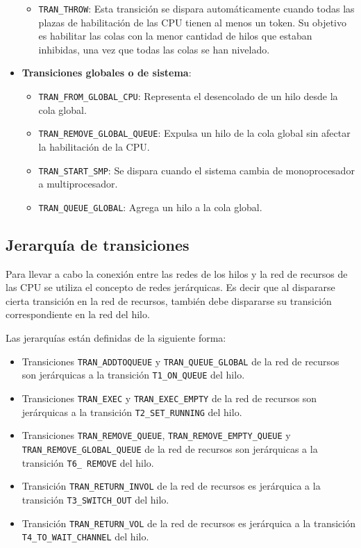\begin{itemize}
\begin{itemize}
            \item \verb|TRAN_THROW|: Esta transición se dispara automáticamente cuando todas las plazas de habilitación de las CPU tienen al menos un token. Su objetivo es habilitar las colas con la menor cantidad de hilos que estaban inhibidas, una vez que todas las colas se han nivelado.
        \end{itemize}
    \item \textbf{Transiciones globales o de sistema}:
        \begin{itemize}
            \item \verb|TRAN_FROM_GLOBAL_CPU|: Representa el desencolado de un hilo desde la cola global.
            \item \verb|TRAN_REMOVE_GLOBAL_QUEUE|: Expulsa un hilo de la cola global sin afectar la habilitación de la CPU.
            \item \verb|TRAN_START_SMP|: Se dispara cuando el sistema cambia de monoprocesador a multiprocesador.
            \item \verb|TRAN_QUEUE_GLOBAL|: Agrega un hilo a la cola global.
        \end{itemize}
    \end{itemize}


\subsection{Jerarquía de transiciones}
Para llevar a cabo la conexión entre las redes de los hilos y la red de recursos de las CPU se utiliza el concepto de redes jerárquicas. Es decir que al dispararse cierta transición en la red de recursos, también debe dispararse su transición correspondiente en la red del hilo.

Las jerarquías están definidas de la siguiente forma:

\begin{itemize}
    \item Transiciones \verb|TRAN_ADDTOQUEUE| y \verb|TRAN_QUEUE_GLOBAL| de la red de recursos son jerárquicas a la transición \verb|T1_ON_QUEUE| del hilo.
    \item Transiciones \verb|TRAN_EXEC| y \verb|TRAN_EXEC_EMPTY| de la red de recursos son jerárquicas a la transición \verb|T2_SET_RUNNING| del hilo.
    \item Transiciones \verb|TRAN_REMOVE_QUEUE|, \verb|TRAN_REMOVE_EMPTY_QUEUE| y \verb|TRAN_REMOVE_GLOBAL_QUEUE| de la red de recursos son jerárquicas a la transición \verb|T6_ REMOVE| del hilo.
    \item Transición \verb|TRAN_RETURN_INVOL| de la red de recursos es jerárquica a la transición \verb|T3_SWITCH_OUT| del hilo.
    \item Transición \verb|TRAN_RETURN_VOL| de la red de recursos es jerárquica a la transición \verb|T4_TO_WAIT_CHANNEL| del hilo.
\end{itemize}

